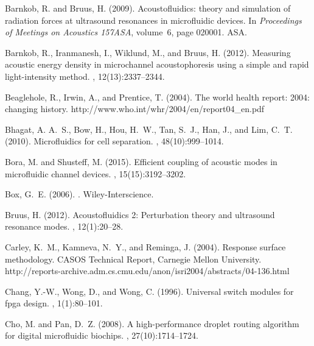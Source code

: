 \documentclass[12pt,letterpaper]{report}          %
\begin{document}
\begin{thebibliography}{}
Barnkob, R. and Bruus, H. (2009).
\newblock Acoustofluidics: theory and simulation of radiation forces at
  ultrasound resonances in microfluidic devices.
\newblock In {\em Proceedings of Meetings on Acoustics 157ASA}, volume~6, page
  020001. ASA.

Barnkob, R., Iranmanesh, I., Wiklund, M., and Bruus, H. (2012).
\newblock Measuring acoustic energy density in microchannel acoustophoresis
  using a simple and rapid light-intensity method.
, 12(13):2337--2344.

Beaglehole, R., Irwin, A., and Prentice, T. (2004).
\newblock The world health report: 2004: changing history. http://www.who.int/whr/2004/en/report04\_en.pdf

Bhagat, A. A.~S., Bow, H., Hou, H.~W., Tan, S.~J., Han, J., and Lim, C.~T.
  (2010).
\newblock Microfluidics for cell separation.
,
  48(10):999--1014.

Bora, M. and Shusteff, M. (2015).
\newblock Efficient coupling of acoustic modes in microfluidic channel devices.
, 15(15):3192--3202.

Box, G.~E. (2006).
.
\newblock Wiley-Interscience.

Bruus, H. (2012).
\newblock Acoustofluidics 2: Perturbation theory and ultrasound resonance
  modes.
, 12(1):20--28.

Carley, K.~M., Kamneva, N.~Y., and Reminga, J. (2004).
\newblock Response surface methodology.
\newblock CASOS Technical Report, Carnegie Mellon University. http://reports-archive.adm.cs.cmu.edu/anon/isri2004/abstracts/04-136.html

Chang, Y.-W., Wong, D., and Wong, C. (1996).
\newblock Universal switch modules for fpga design.
, 1(1):80--101.

Cho, M. and Pan, D.~Z. (2008).
\newblock A high-performance droplet routing algorithm for digital microfluidic
  biochips.
, 27(10):1714--1724.


\end{thebibliography}
\end{document}
